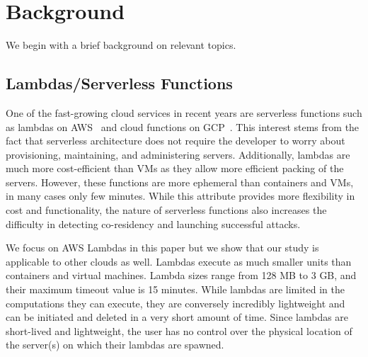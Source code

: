 \section{Background}
\label{sec:background}

We begin with a brief background on relevant topics.

\subsection{Lambdas/Serverless Functions}
\label{sec:background:lambdas}
One of the fast-growing cloud services in recent years are serverless functions such as lambdas on AWS~\cite{awslambda} and cloud functions on GCP~\cite{gcpfunctions}. This interest stems from the fact that serverless architecture does not require the developer to worry about provisioning, maintaining, and administering servers. Additionally, lambdas are much more cost-efficient than VMs as they allow more efficient packing of the servers. However, these functions are more ephemeral than containers and VMs, in many cases only  few minutes. While this attribute provides more flexibility in cost and functionality, the nature of serverless functions also increases the difficulty in detecting co-residency and launching successful attacks.

We focus on AWS Lambdas in this paper but we show that our study is applicable to other clouds as well. Lambdas execute as much smaller units than containers and virtual machines. Lambda sizes range from 128 MB to 3 GB, and their maximum timeout value is 15 minutes. While lambdas are limited in the computations they can execute, they are conversely incredibly lightweight and can be initiated and deleted in a very short amount of time. Since lambdas are short-lived and lightweight, the user has no control over the physical location of the server(s) on which their lambdas are spawned. 



